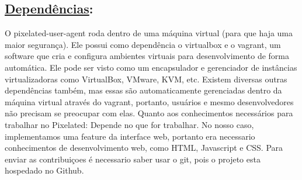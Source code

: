 \subsection*{\underline{Dependências}:}

O pixelated-user-agent roda dentro de uma máquina virtual (para que haja uma maior segurança).
    Ele possui como dependência o virtualbox e o vagrant, um software que cria e configura ambientes virtuais para desenvolvimento de forma automática. Ele pode ser visto como um encapsulador e gerenciador de instâncias virtualizadoras como VirtualBox, VMware, KVM, etc.
Existem diversas outras dependências também, mas essas são automaticamente gerenciadas dentro da máquina virtual através do vagrant, portanto, usuários e mesmo desenvolvedores não precisam se preocupar com elas.
Quanto aos conhecimentos necessários para trabalhar no Pixelated:
Depende no que for trabalhar. No nosso caso, implementamos uma feature da interface web, portanto era necessario conhecimentos de desenvolvimento web, como HTML, Javascript e CSS.
Para enviar as contribuiçoes é necessario saber usar o git, pois o projeto esta hospedado no Github.